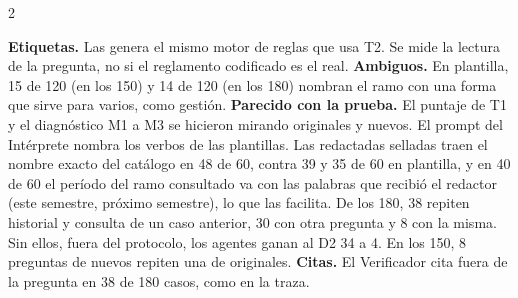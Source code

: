 \documentclass[9pt,a4paper]{extarticle}
\newcommand{\q}{\textquotedbl}
\begin{document}
\begin{multicols}{2}
{\footnotesize
\textbf{Etiquetas.} Las genera el mismo motor de reglas que usa T2. Se mide la lectura
de la pregunta, no si el reglamento codificado es el real.
\textbf{Ambiguos.} En plantilla, 15 de 120 (en los 150) y 14 de 120 (en los 180) nombran el
ramo con una forma que sirve para varios, como \q gestión\q.
\textbf{Parecido con la prueba.} El puntaje de T1 y el diagnóstico M1 a M3 se hicieron mirando
originales y nuevos. El prompt del Intérprete nombra los verbos de las plantillas. Las
redactadas selladas traen el nombre exacto del catálogo en 48 de 60, contra 39 y 35 de 60
en plantilla, y en 40 de 60 el período del ramo consultado va con las palabras que recibió el
redactor (\q este semestre\q, \q próximo semestre\q), lo que las facilita. De los 180, 38
repiten historial y consulta de un caso anterior, 30 con otra pregunta y 8 con la misma.
Sin ellos, fuera del protocolo, los agentes ganan al D2 34 a 4. En los 150, 8 preguntas de
nuevos repiten una de originales.
\textbf{Citas.} El Verificador cita fuera de la pregunta en 38 de 180 casos, como en la traza.\par}


\end{multicols}
\end{document}
